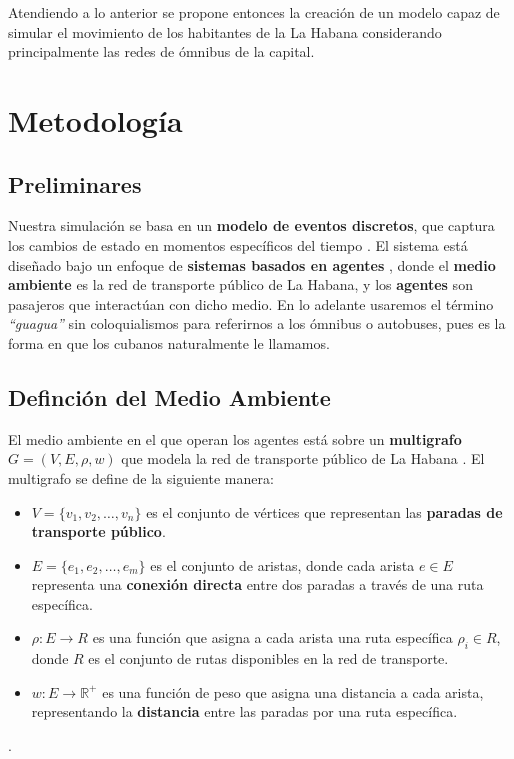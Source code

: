 \documentclass[a4paper,12pt]{article}
\begin{document}
Atendiendo a lo anterior se propone entonces la creaci\'on de un modelo capaz de simular el movimiento de los habitantes de la La Habana considerando principalmente las redes de \'omnibus de la capital. 

\section{Metodología}
\subsection{Preliminares}
Nuestra simulación se basa en un \textbf{modelo de eventos discretos}, que captura los cambios de estado en momentos específicos del tiempo \cite{law2014simulation}. El sistema está diseñado bajo un enfoque de \textbf{sistemas basados en agentes} \cite{wooldridge2009introduction}, donde el \textbf{medio ambiente} es la red de transporte público de La Habana, y los \textbf{agentes} son pasajeros que interactúan con dicho medio. En lo adelante usaremos el término \textit{``guagua''} sin coloquialismos para referirnos a los \'omnibus o autobuses, pues es la forma en que los cubanos naturalmente le llamamos. 

\subsection{Definci\'on del Medio Ambiente}
\label{medio_ambiente}

El medio ambiente en el que operan los agentes está sobre un \textbf{multigrafo} $G = (V, E, \rho, w)$ que modela la red de transporte público de La Habana \cite{evans2021public}. El multigrafo se define de la siguiente manera:

\begin{itemize}
    \item $V = \{v_1, v_2, \dots, v_n\}$ es el conjunto de vértices que representan las \textbf{paradas de transporte público}.
    \item $E = \{e_1, e_2, \dots, e_m\}$ es el conjunto de aristas, donde cada arista $e \in E$ representa una \textbf{conexión directa} entre dos paradas a través de una ruta específica.
    \item $\rho: E \rightarrow R$ es una función que asigna a cada arista una ruta específica $\rho_i \in R$, donde $R$ es el conjunto de rutas disponibles en la red de transporte.
    \item $w: E \rightarrow \mathbb{R}^+$ es una función de peso que asigna una distancia a cada arista, representando la \textbf{distancia} entre las paradas por una ruta específica.
\end{itemize}.
\end{document}

